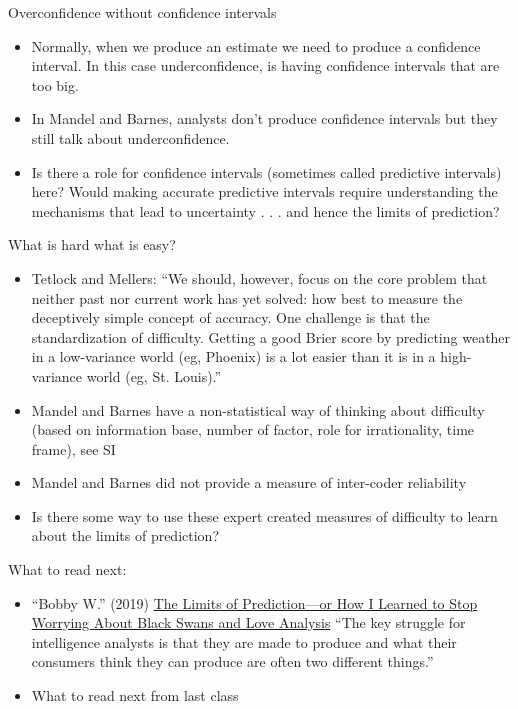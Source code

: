 \documentclass[aspectratio=169]{beamer}
\begin{document}
\begin{frame}

Overconfidence without confidence intervals \pause
\begin{itemize}
\item Normally, when we produce an estimate we need to produce a confidence interval.  In this case underconfidence, is having confidence intervals that are too big.
\pause
\item In Mandel and Barnes, analysts don't produce confidence intervals but they still talk about underconfidence.
\pause
\item Is there a role for confidence intervals (sometimes called predictive intervals) here? Would making accurate predictive intervals require understanding the mechanisms that lead to uncertainty  . . . and hence the limits of prediction?
\end{itemize}

\end{frame}
\begin{frame}

What is hard what is easy?
\begin{itemize}
\item Tetlock and Mellers: ``We should, however, focus on the core problem that neither past nor current work has yet solved: how best to measure the deceptively simple concept of accuracy. \pause One challenge is that the standardization of difficulty.  Getting a good Brier score by predicting weather in a low-variance world (eg, Phoenix) is a lot easier than it is in a high-variance world (eg, St. Louis).''
\pause
\item Mandel and Barnes have a non-statistical way of thinking about difficulty (based on information base, number of factor, role for irrationality, time frame), see SI
\pause 
\item Mandel and Barnes did not provide a measure of  inter-coder reliability
\pause
\item Is there some way to use these expert created measures of difficulty to learn about the limits of prediction?
\end{itemize}

\end{frame}
\begin{frame}

What to read next:
\begin{itemize}
\item ``Bobby W.'' (2019) \href{https://www.cia.gov/library/center-for-the-study-of-intelligence/csi-publications/csi-studies/studies/vol-63-no-4/Limits-of-Prediction.html}{The Limits of Prediction---or How I Learned to Stop Worrying About Black Swans and Love Analysis} ``The key struggle for intelligence analysts is that they are made to produce and what their consumers think they can produce are often two different things.''
\item What to read next from last class
\end{itemize}

\end{frame}
\end{document}
